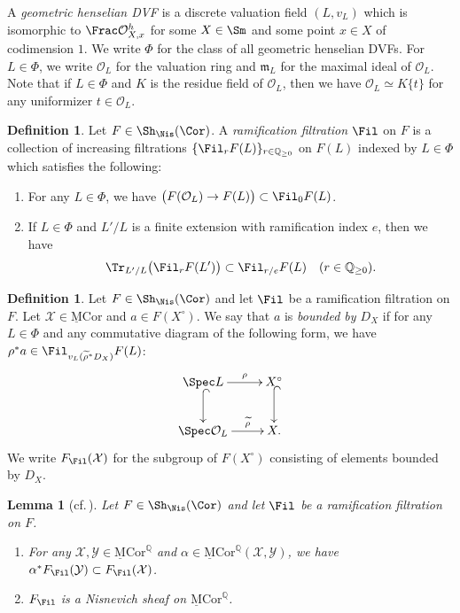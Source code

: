 \documentclass{amsart}
\theoremstyle{plain}
\newtheorem{lemma}[theorem]{Lemma}
\theoremstyle{definition}
\newtheorem{definition}[theorem]{Definition}
\theoremstyle{remark}
\numberwithin{equation}{section}
\let\Im\relax
\def\MCor{\mathrm{\underline{M}Cor}}
\begin{document}
A \emph{geometric henselian DVF} is a discrete valuation field $(L,v_L)$ which is isomorphic to $\Frac \mathcal{O}^h_{X,x}$ for some $X\in \Sm$ and some point $x\in X$ of codimension $1$.
We write $\Phi$ for the class of all geometric henselian DVFs.
For $L\in \Phi$, we write $\mathcal{O}_L$ for the valuation ring and $\mathfrak{m}_L$ for the maximal ideal of $\mathcal{O}_L$.
Note that if $L\in \Phi$ and $K$ is the residue field of $\mathcal{O}_L$, then we have $\mathcal{O}_L\simeq K\{t\}$ for any uniformizer $t\in \mathcal{O}_L$.

\begin{definition}\label{def:ram_fil}
	Let $F\in \Sh_\Nis(\Cor)$.
	A \emph{ramification filtration} $\Fil$ on $F$ is a collection of increasing filtrations $\{\Fil_r F(L)\}_{r\in \mathbb{Q}_{\geq 0}}$ on $F(L)$ indexed by $L\in \Phi$ which satisfies the following:
	\begin{enumerate}
		\item	For any $L\in \Phi$, we have $\Im\bigl(F(\mathcal{O}_L)\to F(L)\bigr)\subset \Fil_0F(L)$.
		\item	If $L\in \Phi$ and $L'/L$ is a finite extension with ramification index $e$, then we have
				$$
					\Tr_{L'/L}\bigl(\Fil_r F(L')\bigr)\subset \Fil_{r/e}F(L)\quad (r\in \mathbb{Q}_{\geq 0}).
				$$
	\end{enumerate}
\end{definition}

\begin{definition}
	Let $F\in \Sh_\Nis(\Cor)$ and let $\Fil$ be a ramification filtration on $F$.
	Let $\mathcal{X}\in \MCor$ and $a\in F(X^\circ)$.
	We say that $a$ is \emph{bounded by $D_X$} if for any $L\in \Phi$ and any commutative diagram of the following form, we have $\rho^*a\in \Fil_{v_L(\widetilde{\rho}^*D_X)}F(L)$:
        \begin{align}\label{DVR_diagram}
            \xymatrix{
                \Spec L\ar[r]^-{\rho}\ar@{^(->}[d]             &X^\circ\ar@{^(->}[d]\\
                \Spec \mathcal{O}_L\ar[r]^-{\widetilde{\rho}}       &X.
            }
        \end{align}
	We write $F_{\Fil}(\mathcal{X})$ for the subgroup of $F(X^\circ)$ consisting of elements bounded by $D_X$.
\end{definition}

\begin{lemma}[cf.\,{\cite[Proposition 4.7]{RS21}}]\label{lem:ram_fil}
	Let $F\in \Sh_\Nis(\Cor)$ and let $\Fil$ be a ramification filtration on $F$.
	\begin{enumerate}
		\item	For any $\mathcal{X},\mathcal{Y}\in \MCor^{\mathbb{Q}}$ and $\alpha\in \MCor^{\mathbb{Q}}(\mathcal{X},\mathcal{Y})$, we have $\alpha^*F_{\Fil} (\mathcal{Y})\subset F_{\Fil} (\mathcal{X})$.
		\item	$F_{\Fil}$ is a Nisnevich sheaf on $\MCor^\mathbb{Q}$.
	\end{enumerate}
\end{lemma}
\end{document}
